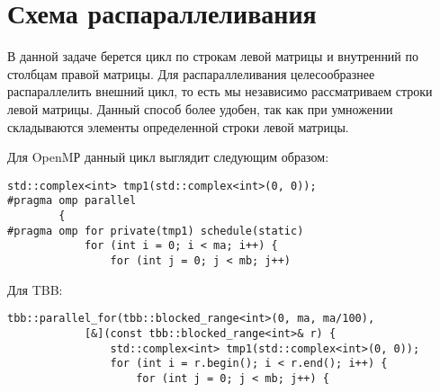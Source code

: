 \documentclass{report}
\begin{document}
\section*{Схема распараллеливания}
\par В данной задаче берется цикл по строкам левой матрицы и внутренний по столбцам правой матрицы. Для распараллеливания целесообразнее распараллелить внешний цикл, то есть мы независимо рассматриваем строки левой матрицы. Данный способ более удобен, так как при умножении складываются элементы определенной строки левой матрицы.
\par Для OpenMР данный цикл выглядит следующим образом:
\begin{lstlisting}
std::complex<int> tmp1(std::complex<int>(0, 0));
#pragma omp parallel
        {
#pragma omp for private(tmp1) schedule(static)
            for (int i = 0; i < ma; i++) {
                for (int j = 0; j < mb; j++)
 \end{lstlisting}
 \par Для TBB:
\begin{lstlisting}
tbb::parallel_for(tbb::blocked_range<int>(0, ma, ma/100),
            [&](const tbb::blocked_range<int>& r) {
                std::complex<int> tmp1(std::complex<int>(0, 0));
                for (int i = r.begin(); i < r.end(); i++) {
                    for (int j = 0; j < mb; j++) {
 \end{lstlisting}
\newpage

\end{document}
